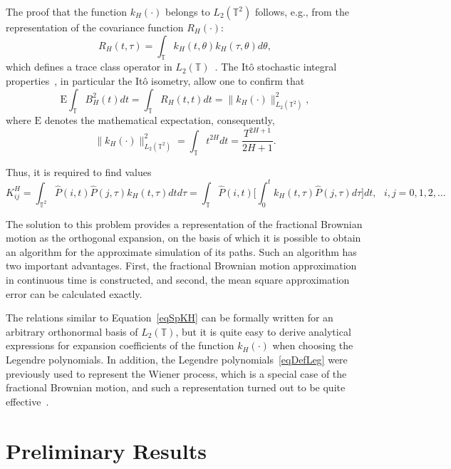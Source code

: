 \documentclass[10pt,reqno]{amsart}
\theoremstyle{plain}
\theoremstyle{remark}
\newcommand{\LPT}{{L_2(\mathds{T})}}
\newcommand{\LPTT}{{L_2(\mathds{T}^2)}}
\begin{document}
The proof that the function $k_H(\cdot)$ belongs to $\LPTT$ follows, e.g., from the representation of the covariance function $R_H(\cdot)$:
\[
  R_H(t,\tau) = \int_\mathds{T} {k_H(t,\theta) k_H(\tau,\theta) d\theta},
\]
which defines a trace class operator in $\LPT$~\cite{GihSco_77}. The It\^o stochastic integral properties~\cite{Oks_03}, in particular the It\^o isometry, allow one to confirm that
\[
  \mathrm{E} \int_\mathds{T} B_H^2(t) dt = \int_\mathds{T} R_H(t,t) dt = \| k_H(\cdot) \|_\LPTT^2,
\]
where $\mathrm{E}$ denotes the mathematical expectation, consequently,
\begin{equation}\label{eqKHSquaredNorm}
  \| k_H(\cdot) \|_\LPTT^2 = \int_\mathds{T} t^{2H} dt = \frac{T^{2H+1}}{2H+1}.
\end{equation}

Thus, it is required to find values
\begin{equation}\label{eqSpKH}
  K_{ij}^H = \int_{\mathds{T}^2} \hat P(i,t) \hat P(j,\tau) k_H(t,\tau) dt d\tau = \int_\mathds{T} \hat P(i,t) \biggl[ \int_0^t k_H(t,\tau) \hat P(j,\tau) d\tau\biggr] dt, \ \ \ i,j = 0,1,2,\dots
\end{equation}

The solution to this problem provides a representation of the fractional Brownian motion as the orthogonal expansion, on the basis of which it is possible to obtain an algorithm for the approximate simulation of its paths. Such an algorithm has two important advantages. First, the fractional Brownian motion approximation in continuous time is constructed, and second, the mean square approximation error can be calculated exactly.

The relations similar to Equation~\eqref{eqSpKH} can be formally written for an arbitrary orthonormal basis of $\LPT$, but it is quite easy to derive analytical expressions for expansion coefficients of the function $k_H(\cdot)$ when choosing the Legendre polynomials. In addition, the Legendre polynomials~\eqref{eqDefLeg} were previously used to represent the Wiener process, which is a special case of the fractional Brownian motion, and such a representation turned out to be quite effective~\cite{Kuz_JVMMF19, Kuz_DUPU20}.



\section{Preliminary Results}\label{secPreliminary}
\end{document}
